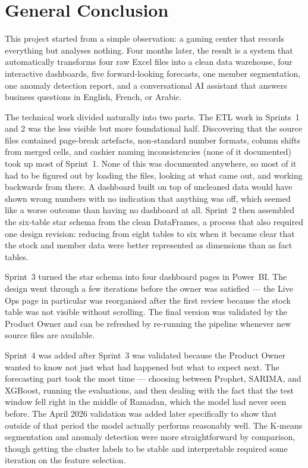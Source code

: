 \documentclass[12pt, a4paper]{report}
\begin{document}
\chapter*{General Conclusion}

This project started from a simple observation: a gaming center that records
everything but analyses nothing. Four months later, the result is a system that
automatically transforms four raw Excel files into a clean data warehouse, four
interactive dashboards, five forward-looking forecasts, one member segmentation,
one anomaly detection report, and a conversational AI assistant that answers
business questions in English, French, or Arabic.

The technical work divided naturally into two parts. The ETL work in Sprints~1 and 2
was the less visible but more foundational half. Discovering that the source files
contained page-break artefacts, non-standard number formats, column shifts from
merged cells, and cashier naming inconsistencies (none of it documented) took up
most of Sprint~1. None of this was documented anywhere, so most of it had to be
figured out by loading the files, looking at what came out, and working backwards
from there. A dashboard built on top of uncleaned data would have shown wrong
numbers with no indication that anything was off, which seemed like a worse
outcome than having no dashboard at all.
Sprint~2 then assembled the six-table star schema from the clean DataFrames, a
process that also required one design revision: reducing from eight tables to six
when it became clear that the stock and member data were better represented as
dimensions than as fact tables.

Sprint~3 turned the star schema into four dashboard pages in Power~BI. The
design went through a few iterations before the owner was satisfied --- the
Live Ops page in particular was reorganised after the first review because
the stock table was not visible without scrolling. The final version was
validated by the Product Owner and can be refreshed by re-running the pipeline
whenever new source files are available.

Sprint~4 was added after Sprint~3 was validated because the Product Owner wanted
to know not just what had happened but what to expect next. The forecasting part
took the most time --- choosing between Prophet, SARIMA, and XGBoost, running the
evaluations, and then dealing with the fact that the test window fell right in the
middle of Ramadan, which the model had never seen before. The April 2026 validation
was added later specifically to show that outside of that period the model actually
performs reasonably well. The K-means segmentation and anomaly detection were more
straightforward by comparison, though getting the cluster labels to be stable and
interpretable required some iteration on the feature selection.
\end{document}
